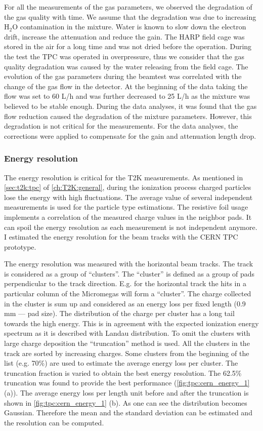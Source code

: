 \documentclass[../main.tex]{subfiles}
\begin{document}
For all the measurements of the gas parameters, we observed the degradation of the gas quality with time. We assume that the degradation was due to increasing $\text{H}_2\text{O}$ contamination in the mixture. Water is known to slow down the electron drift, increase the attenuation and reduce the gain. The HARP field cage was stored in the air for a long time and was not dried before the operation. During the test the TPC was operated in overpressure, thus we consider that the gas quality degradation was caused by the water releasing from the field cage. The evolution of the gas parameters during the beamtest was correlated with the change of the gas flow in the detector. At the beginning of the data taking the flow was set to 60 L/h and was further decreased to 25 L/h as the mixture was believed to be stable enough. During the data analyses, it was found that the gas flow reduction caused the degradation of the mixture parameters. However, this degradation is not critical for the measurements. For the data analyses, the corrections were applied to compensate for the gain and attenuation length drop.

\subsubsection{Energy resolution}
\label{sec:tpc:tpc_dedx}
The energy resolution is critical for the T2K measurements. As mentioned in \autoref{sec:t2k:tpc} of \autoref{ch:T2K:general}, during the ionization process charged particles lose the energy with high fluctuations. The average value of several independent measurements is used for the particle type estimations. The resistive foil usage implements a correlation of the measured charge values in the neighbor pads. It can spoil the energy resolution as each measurement is not independent anymore. I estimated the energy resolution for the beam tracks with the CERN TPC prototype.

The energy resolution was measured with the horizontal beam tracks. The track is considered as a group of ``clusters''. The ``cluster'' is defined as a group of pads perpendicular to the track direction. E.g. for the horizontal track the hits in a particular column of the Micromegas will form a ``cluster''. The charge collected in the cluster is sum up and considered as an energy loss per fixed length (0.9 mm --- pad size). The distribution of the charge per cluster has a long tail towards the high energy. This is in agreement with the expected ionization energy spectrum as it is described with Landau distribution. To omit the clusters with large charge deposition the ``truncation'' method is used. All the clusters in the track are sorted by increasing charges. Some clusters from the beginning of the list (e.g. 70\%) are used to estimate the average energy loss per cluster. The truncation fraction is varied to obtain the best energy resolution. The 62.5\% truncation was found to provide the best performance (\autoref{fig:tpc:cern_energy_1} (a)). The average energy loss per length unit before and after the truncation is shown in \autoref{fig:tpc:cern_energy_1} (b). As one can see the distribution becomes Gaussian. Therefore the mean and the standard deviation can be estimated and the resolution can be computed.
\end{document}
